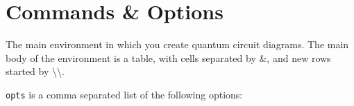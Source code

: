 \documentclass[aps,pra,10pt,nofootinbib]{revtex4-2}
\begin{document}

\newpage
\section{Commands \& Options}

\begin{description}[style=nextline]
\item [\textbackslash begin\{quantikz\}{[opts]}\ldots\textbackslash end\{quantikz\}]
The main environment in which you create quantum circuit diagrams. The main body of the environment is a table, with cells separated by \&, and new rows started by \textbackslash\textbackslash.

\texttt{opts} is a comma separated list of the following options:


\end{description}
\end{document}
